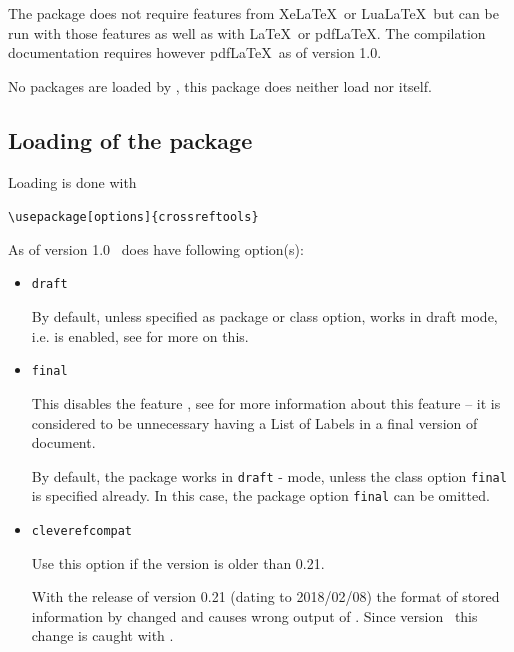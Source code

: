 \documentclass[12pt,a4paper,oneside]{article}
\def\packageversion{1.0}
\newcommand{\PackageDocName}{crossreftools}%
\begin{document}
The package does not require features from Xe\LaTeX\ or Lua\LaTeX\ but can be run with those features as well as with \LaTeX\ or pdf\LaTeX. The compilation documentation requires however pdf\LaTeX\ as of version \packageversion. 

No packages are loaded by , this package does neither load  nor  itself. 


\subsection{Loading of the package} \label{subsection::loadingofpackage}

Loading is done with

\begin{tcolorbox}
\verb!\usepackage[options]{crossreftools}!
\end{tcolorbox}

As of version \packageversion\ \CHDocPackage{\PackageDocName} does have following option(s):

\begin{itemize}
  \item \texttt{draft}
    
    By default, unless specified as package or class option, \CHDocPackage{\PackageDocName} works in draft mode, i.e.  is enabled, see   for more on this. 
    
  \item \texttt{final}

    This disables the feature , see   for more information about this feature -- it is considered to be unnecessary having a List of Labels in a final version of document. 

By default, the package works in \texttt{draft} - mode, unless the class option \texttt{final} is specified already. In this case, the package option \texttt{final} can be omitted. 
\item \texttt{cleverefcompat}

Use this option if the  version is older than 0.21. 

\begin{marker}
With the release of  version 0.21 (dating to 2018/02/08) the format of stored information by  changed and causes wrong output of . Since version \makeatletter{}\makeatother\ this change is caught with . 
\end{marker}
\end{itemize}
\end{document}
